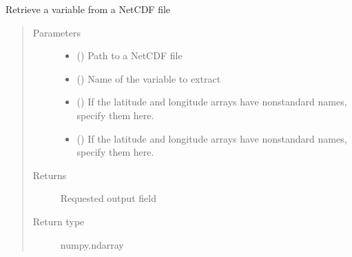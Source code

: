 \documentclass[letterpaper,10pt,english]{sphinxmanual}
\begin{document}
\begin{fulllineitems}
\label{\detokenize{source/exoplasim:exoplasim.gcmt.parse}}
Retrieve a variable from a NetCDF file
\begin{quote}\begin{description}
\item[{Parameters}] \leavevmode\begin{itemize}
\item {} 
 () \textendash{} Path to a NetCDF file

\item {} 
 () \textendash{} Name of the variable to extract

\item {} 
 (\sphinxstyleliteralemphasis{\sphinxupquote{, }}) \textendash{} If the latitude and longitude arrays have non\sphinxhyphen{}standard names, specify them here.

\item {} 
 (\sphinxstyleliteralemphasis{\sphinxupquote{, }}) \textendash{} If the latitude and longitude arrays have non\sphinxhyphen{}standard names, specify them here.

\end{itemize}

\item[{Returns}] \leavevmode
Requested output field

\item[{Return type}] \leavevmode
numpy.ndarray

\end{description}\end{quote}

\end{fulllineitems}

\end{document}
